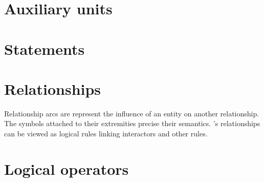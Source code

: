 




\section{Auxiliary units}\label{sec:aux}




%

  
\section{Statements}\label{sec:statements}




\section{Relationships}\label{sec:relationships}

Relationship arcs are represent the influence of an entity on another relationship. The symbols attached to their extremities precise their semantics. \SBGNERLone's relationships can be viewed as logical rules linking interactors and other rules.









\section{Logical operators}\label{sec:logic}
 





